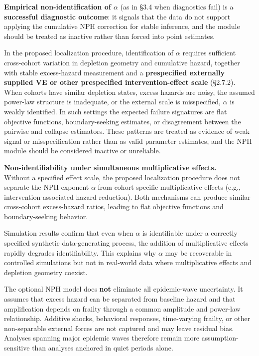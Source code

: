 \documentclass[
]{article}
\begin{document}
\textbf{Empirical non-identification of \(\alpha\)} (as in §3.4 when diagnostics fail) is a \textbf{successful diagnostic outcome}: it signals that the data do not support applying the cumulative NPH correction for stable inference, and the module should be treated as inactive rather than forced into point estimates.

In the proposed localization procedure, identification of \(\alpha\) requires sufficient cross-cohort variation in depletion geometry and cumulative hazard, together with stable excess-hazard measurement and a \textbf{prespecified externally supplied VE or other prespecified intervention-effect scale} (§2.7.2). When cohorts have similar depletion states, excess hazards are noisy, the assumed power-law structure is inadequate, or the external scale is misspecified, \(\alpha\) is weakly identified. In such settings the expected failure signatures are flat objective functions, boundary-seeking estimates, or disagreement between the pairwise and collapse estimators. These patterns are treated as evidence of weak signal or misspecification rather than as valid parameter estimates, and the NPH module should be considered inactive or unreliable.

\textbf{Non-identifiability under simultaneous multiplicative effects.}\\
Without a specified effect scale, the proposed localization procedure does not separate the NPH exponent \(\alpha\) from cohort-specific multiplicative effects (e.g., intervention-associated hazard reduction). Both mechanisms can produce similar cross-cohort excess-hazard ratios, leading to flat objective functions and boundary-seeking behavior.

Simulation results confirm that even when \(\alpha\) is identifiable under a correctly specified synthetic data-generating process, the addition of multiplicative effects rapidly degrades identifiability. This explains why \(\alpha\) may be recoverable in controlled simulations but not in real-world data where multiplicative effects and depletion geometry coexist.

The optional NPH model does \textbf{not} eliminate all epidemic-wave uncertainty. It assumes that excess hazard can be separated from baseline hazard and that amplification depends on frailty through a common amplitude and power-law relationship. Additive shocks, behavioral responses, time-varying frailty, or other non-separable external forces are not captured and may leave residual bias. Analyses spanning major epidemic waves therefore remain more assumption-sensitive than analyses anchored in quiet periods alone.
\end{document}
